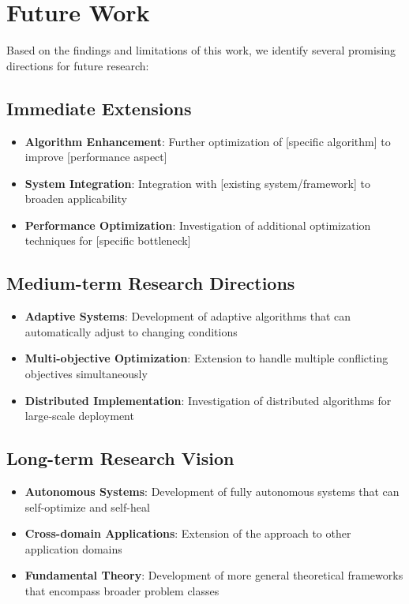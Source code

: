 \section{Future Work}

Based on the findings and limitations of this work, we identify several promising directions for future research:

\subsection{Immediate Extensions}

\begin{itemize}
    \item \textbf{Algorithm Enhancement}: Further optimization of [specific algorithm] to improve [performance aspect]
    \item \textbf{System Integration}: Integration with [existing system/framework] to broaden applicability
    \item \textbf{Performance Optimization}: Investigation of additional optimization techniques for [specific bottleneck]
\end{itemize}

\subsection{Medium-term Research Directions}

\begin{itemize}
    \item \textbf{Adaptive Systems}: Development of adaptive algorithms that can automatically adjust to changing conditions
    \item \textbf{Multi-objective Optimization}: Extension to handle multiple conflicting objectives simultaneously
    \item \textbf{Distributed Implementation}: Investigation of distributed algorithms for large-scale deployment
\end{itemize}

\subsection{Long-term Research Vision}

\begin{itemize}
    \item \textbf{Autonomous Systems}: Development of fully autonomous systems that can self-optimize and self-heal
    \item \textbf{Cross-domain Applications}: Extension of the approach to other application domains
    \item \textbf{Fundamental Theory}: Development of more general theoretical frameworks that encompass broader problem classes
\end{itemize}

